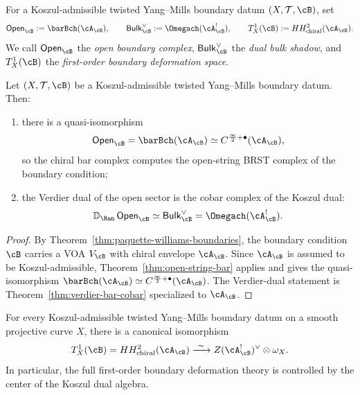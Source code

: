 \begin{notation}
\label{not:twisted-ym-boundary-objects}
For a Koszul-admissible twisted Yang--Mills boundary datum $(X,\mathcal{T},\cB)$, set
\[
\mathsf{Open}_{\cB} := \barBch(\cA_{\cB}),
\qquad
\mathsf{Bulk}^{\vee}_{\cB} := \Omegach(\cA_{\cB}^!),
\qquad
T^1_X(\cB) := HH^2_{\mathrm{chiral}}(\cA_{\cB}).
\]
We call $\mathsf{Open}_{\cB}$ the \emph{open boundary complex}, $\mathsf{Bulk}^{\vee}_{\cB}$ the
\emph{dual bulk shadow}, and $T^1_X(\cB)$ the \emph{first-order boundary deformation space}.
\end{notation}

\begin{theorem}
\label{thm:twisted-ym-boundary-brst}
Let $(X,\mathcal{T},\cB)$ be a Koszul-admissible twisted Yang--Mills boundary datum.
Then:
\begin{enumerate}[label=(\alph*)]
\item there is a quasi-isomorphism
\[
\mathsf{Open}_{\cB} = \barBch(\cA_{\cB}) \simeq C^{\frac{\infty}{2}+\bullet}(\cA_{\cB}),
\]
so the chiral bar complex computes the open-string BRST complex of the boundary condition;
\item the Verdier dual of the open sector is the cobar complex of the Koszul dual:
\[
\mathbb{D}_{\Ran}\, \mathsf{Open}_{\cB} \simeq \mathsf{Bulk}^{\vee}_{\cB} = \Omegach(\cA_{\cB}^!).
\]
\end{enumerate}
\end{theorem}

\begin{proof}
By Theorem~\ref{thm:paquette-williams-boundaries}, the boundary condition $\cB$ carries a
VOA $V_{\cB}$ with chiral envelope $\cA_{\cB}$.  Since $\cA_{\cB}$ is assumed to be
Koszul-admissible, Theorem~\ref{thm:open-string-bar} applies and gives the quasi-isomorphism
$\barBch(\cA_{\cB}) \simeq C^{\frac{\infty}{2}+\bullet}(\cA_{\cB})$.  The Verdier-dual statement is
Theorem~\ref{thm:verdier-bar-cobar} specialized to $\cA_{\cB}$.
\end{proof}

\begin{theorem}
\label{thm:twisted-ym-tangent-center}
For every Koszul-admissible twisted Yang--Mills boundary datum on a smooth projective
curve $X$, there is a canonical isomorphism
\[
T^1_X(\cB)
= HH^2_{\mathrm{chiral}}(\cA_{\cB})
\xrightarrow{\ \sim\ }
Z(\cA_{\cB}^!)^{\vee} \otimes \omega_X.
\]
In particular, the full first-order boundary deformation theory is controlled by the center
of the Koszul dual algebra.
\end{theorem}

